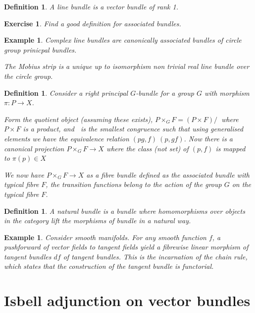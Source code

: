 \documentclass{tufte-book}
\newtheorem{definition}[theorem]{Definition}
\newtheorem{example}[theorem]{Example}
\newtheorem{exercise}[theorem]{Exercise}
\begin{document}
\begin{definition}
	A line bundle is a vector bundle of rank 1.
\end{definition}

\begin{exercise}
	Find a good definition for associated bundles.
\end{exercise}

\begin{example}
	Complex line bundles are canonically associated bundles of circle group prinicpal bundles.

	The Mobius strip is a unique up to isomorphism non trivial real line bundle over the circle group.
\end{example}

\begin{definition}
	Consider a right principal $G$-bundle for a group $G$ with morphism $\pi : P \rightarrow X$.

	Form the quotient object (assuming these exists), $P \times_G F = (P \times F) / ~$ where $P \times F$ is a product, and $~$ is the smallest congruence such that using generalised elements we have the equivalence relation $(pg, f) ~ (p, gf)$. Now there is a canonical projection $P \times_G F \rightarrow X$ where the class (not set) of $(p, f)$ is mapped to $\pi(p) \in X$

	We now have $P \times_G F \rightarrow X$ as a fibre bundle defined as the associated bundle with typical fibre $F$, the transition functions belong to the action of the group $G$ on the typical fibre $F$.
\end{definition}

\begin{definition}
	A natural bundle is a bundle where homomorphisms over objects in the category lift the morphisms of bundle in a natural way.
\end{definition}

\begin{example}
	Consider smooth manifolds. For any smooth function $f$, a pushforward of vector fields to tangent fields yield a fibrewise linear morphism of tangent bundles $df$ of tangent bundles. This is the incarnation of the chain rule, which states that the construction of the tangent bundle is functorial.
\end{example}

\section{Isbell adjunction on vector bundles}
\end{document}
